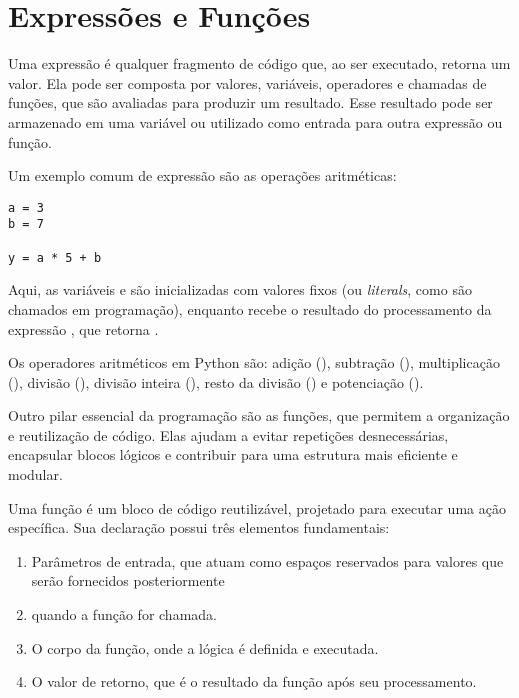 \chapter{Expressões e Funções}

Uma expressão é qualquer fragmento de código que, ao ser executado, retorna um valor.
Ela pode ser composta por valores, variáveis, operadores e chamadas de funções, que são avaliadas para produzir um
resultado.
Esse resultado pode ser armazenado em uma variável ou utilizado como entrada para outra expressão ou função.



Um exemplo comum de expressão são as operações aritméticas:
\begin{verbatim}
a = 3
b = 7

y = a * 5 + b
\end{verbatim}

Aqui, as variáveis  e  são inicializadas com valores fixos (ou \emph{literals}, como são
chamados em programação), enquanto 
recebe o resultado do processamento da expressão , que retorna .

Os operadores aritméticos em Python são:
adição (\inlcode{+}),
subtração (\inlcode{-}),
multiplicação (\inlcode{*}),
divisão (\inlcode{/}),
divisão inteira (\inlcode{//}),
resto da divisão (\inlcode{\%}) e
potenciação (\inlcode{**}).








Outro pilar essencial da programação são as funções, que permitem a organização e reutilização de código.
Elas ajudam a evitar repetições desnecessárias, encapsular blocos lógicos e contribuir para uma estrutura mais
eficiente e modular.

Uma função é um bloco de código reutilizável, projetado para executar uma ação específica.
Sua declaração possui três elementos fundamentais:
\begin{enumerate}
\item Parâmetros de entrada, que atuam como espaços reservados para valores que serão fornecidos posteriormente
\item quando a função for chamada.
\item O corpo da função, onde a lógica é definida e executada.
\item O valor de retorno, que é o resultado da função após seu processamento.
\end{enumerate}

